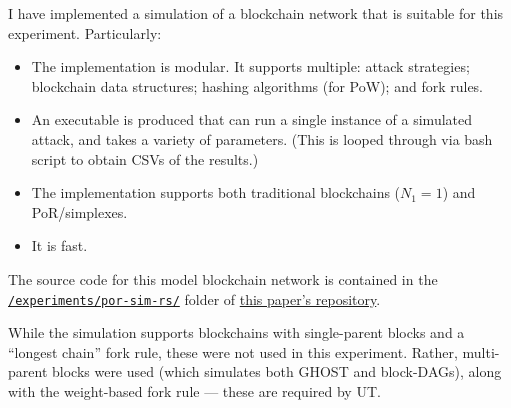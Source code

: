 




I have implemented a simulation of a blockchain network that is suitable for this experiment.
Particularly:

\begin{itemize}
    \item The implementation is modular.
    It supports multiple: attack strategies; blockchain data structures; hashing algorithms (for PoW); and fork rules.
    \item An executable is produced that can run a single instance of a simulated attack, and takes a variety of parameters.
    (This is looped through via bash script to obtain CSVs of the results.)
    \item The implementation supports both traditional blockchains ($N_1 = 1$) and PoR/simplexes.
    \item It is fast.
\end{itemize}

The source code for this model blockchain network is contained in the \href{https://github.com/AmarooHQ/whitepaper/tree/master/experiments/por-sim-rs}{\texttt{/experiments/por-sim-rs/}} folder of \href{https://github.com/AmarooHQ/whitepaper}{this paper's repository}.

While the simulation supports blockchains with single-parent blocks and a ``longest chain'' fork rule, these were not used in this experiment.
Rather, multi-parent blocks were used (which simulates both GHOST and block-DAGs), along with the weight-based fork rule --- these are required by UT.

